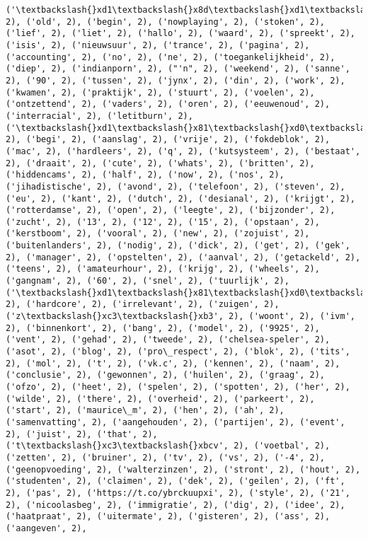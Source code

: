 \documentclass{article}
\begin{document}
\begin{Verbatim}[commandchars=\\\{\}]
('\textbackslash{}xd1\textbackslash{}x8d\textbackslash{}xd1\textbackslash{}x80\textbackslash{}xd0\textbackslash{}xbe\textbackslash{}xd1\textbackslash{}x82\textbackslash{}xd0\textbackslash{}xb8\textbackslash{}xd0\textbackslash{}xba\textbackslash{}xd0\textbackslash{}xb0', 2), ('old', 2), ('begin', 2), ('nowplaying', 2), ('stoken', 2), ('lief', 2), ('liet', 2), ('hallo', 2), ('waard', 2), ('spreekt', 2), ('isis', 2), ('nieuwsuur', 2), ('trance', 2), ('pagina', 2), ('accounting', 2), ('no', 2), ('ne', 2), ('toegankelijkheid', 2), ('diep', 2), ('indianporn', 2), ("'n", 2), ('weekend', 2), ('sanne', 2), ('90', 2), ('tussen', 2), ('jynx', 2), ('din', 2), ('work', 2), ('kwamen', 2), ('praktijk', 2), ('stuurt', 2), ('voelen', 2), ('ontzettend', 2), ('vaders', 2), ('oren', 2), ('eeuwenoud', 2), ('interracial', 2), ('letitburn', 2), ('\textbackslash{}xd1\textbackslash{}x81\textbackslash{}xd0\textbackslash{}xb5\textbackslash{}xd0\textbackslash{}xba\textbackslash{}xd1\textbackslash{}x81', 2), ('begi', 2), ('aanslag', 2), ('vrije', 2), ('fokdeblok', 2), ('mac', 2), ('hardleers', 2), ('q', 2), ('kutsysteem', 2), ('bestaat', 2), ('draait', 2), ('cute', 2), ('whats', 2), ('britten', 2), ('hiddencams', 2), ('half', 2), ('now', 2), ('nos', 2), ('jihadistische', 2), ('avond', 2), ('telefoon', 2), ('steven', 2), ('eu', 2), ('kant', 2), ('dutch', 2), ('desianal', 2), ('krijgt', 2), ('rotterdamse', 2), ('open', 2), ('leegte', 2), ('bijzonder', 2), ('zucht', 2), ('13', 2), ('12', 2), ('15', 2), ('opstaan', 2), ('kerstboom', 2), ('vooral', 2), ('new', 2), ('zojuist', 2), ('buitenlanders', 2), ('nodig', 2), ('dick', 2), ('get', 2), ('gek', 2), ('manager', 2), ('opstelten', 2), ('aanval', 2), ('getackeld', 2), ('teens', 2), ('amateurhour', 2), ('krijg', 2), ('wheels', 2), ('gangnam', 2), ('60', 2), ('snel', 2), ('tuurlijk', 2), ('\textbackslash{}xd1\textbackslash{}x81\textbackslash{}xd0\textbackslash{}xb8\textbackslash{}xd1\textbackslash{}x81\textbackslash{}xd1\textbackslash{}x8c\textbackslash{}xd0\textbackslash{}xba\textbackslash{}xd0\textbackslash{}xb8', 2), ('hardcore', 2), ('irrelevant', 2), ('zuigen', 2), ('z\textbackslash{}xc3\textbackslash{}xb3', 2), ('woont', 2), ('ivm', 2), ('binnenkort', 2), ('bang', 2), ('model', 2), ('9925', 2), ('vent', 2), ('gehad', 2), ('tweede', 2), ('chelsea-speler', 2), ('asot', 2), ('blog', 2), ('pro\_respect', 2), ('blok', 2), ('tits', 2), ('mol', 2), ('t', 2), ('vk.c', 2), ('kennen', 2), ('naam', 2), ('conclusie', 2), ('gewonnen', 2), ('huilen', 2), ('graag', 2), ('ofzo', 2), ('heet', 2), ('spelen', 2), ('spotten', 2), ('her', 2), ('wilde', 2), ('there', 2), ('overheid', 2), ('parkeert', 2), ('start', 2), ('maurice\_m', 2), ('hen', 2), ('ah', 2), ('samenvatting', 2), ('aangehouden', 2), ('partijen', 2), ('event', 2), ('juist', 2), ('that', 2), ('t\textbackslash{}xc3\textbackslash{}xbcv', 2), ('voetbal', 2), ('zetten', 2), ('bruiner', 2), ('tv', 2), ('vs', 2), ('-4', 2), ('geenopvoeding', 2), ('walterzinzen', 2), ('stront', 2), ('hout', 2), ('studenten', 2), ('claimen', 2), ('dek', 2), ('geilen', 2), ('ft', 2), ('pas', 2), ('https://t.co/ybrckuupxi', 2), ('style', 2), ('21', 2), ('nicoolasbeg', 2), ('immigratie', 2), ('dig', 2), ('idee', 2), ('haatpraat', 2), ('uitermate', 2), ('gisteren', 2), ('ass', 2), ('aangeven', 2), 
\end{Verbatim}
\end{document}
